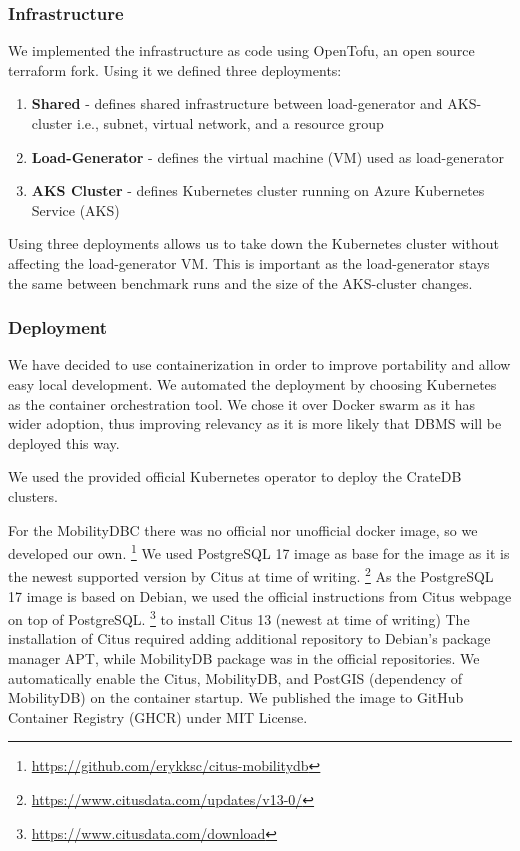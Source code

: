 \subsubsection{Infrastructure}
We implemented the infrastructure as code using OpenTofu, an open source terraform fork.
Using it we defined three deployments:
\begin{enumerate}
	\item \textbf{Shared} - defines shared infrastructure between load-generator and AKS-cluster i.e., subnet, virtual network, and a resource group
	\item \textbf{Load-Generator} - defines the virtual machine (VM) used as load-generator
	\item \textbf{AKS Cluster} - defines Kubernetes cluster running on Azure Kubernetes Service (AKS)
\end{enumerate}

Using three deployments allows us to take down the Kubernetes cluster without affecting the load-generator VM.
This is important as the load-generator stays the same between benchmark runs and the size of the AKS-cluster changes.

\subsubsection{Deployment}

We have decided to use containerization in order to improve portability and allow easy local development.
We automated the deployment by choosing Kubernetes as the container orchestration tool.
We chose it over Docker swarm as it has wider adoption, thus improving relevancy as it is more likely that DBMS will be deployed this way.

We used the provided official Kubernetes operator to deploy the CrateDB clusters.

For the MobilityDBC there was no official nor unofficial docker image, so we developed our own.
\footnote{\url{https://github.com/erykksc/citus-mobilitydb}}
We used PostgreSQL 17 image as base for the image as it is the newest supported version by Citus at time of writing.
\footnote{\url{https://www.citusdata.com/updates/v13-0/}}
As the PostgreSQL 17 image is based on Debian, we used the official instructions from Citus webpage on top of PostgreSQL.
\footnote{\url{https://www.citusdata.com/download}} to install Citus 13 (newest at time of writing)
The installation of Citus required adding additional repository to Debian's package manager APT, while MobilityDB package was in the official repositories.
We automatically enable the Citus, MobilityDB, and PostGIS (dependency of MobilityDB) on the container startup.
We published the image to GitHub Container Registry (GHCR) under MIT License.

